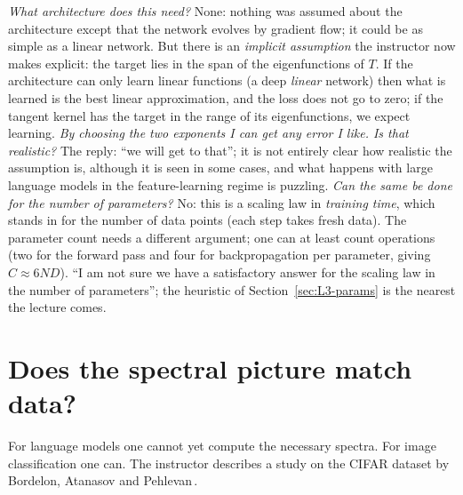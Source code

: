 \begin{discussion}
\emph{What architecture does this need?} None: nothing was assumed about the architecture except that the network evolves by gradient flow; it could be as simple as a linear network. But there is an \emph{implicit assumption} the instructor now makes explicit: the target lies in the span of the eigenfunctions of $T$. If the architecture can only learn linear functions (a deep \emph{linear} network) then what is learned is the best linear approximation, and the loss does not go to zero; if the tangent kernel has the target in the range of its eigenfunctions, we expect learning.
\emph{By choosing the two exponents I can get any error I like. Is that realistic?} The reply: ``we will get to that''; it is not entirely clear how realistic the assumption is, although it is seen in some cases, and what happens with large language models in the feature-learning regime is puzzling.
\emph{Can the same be done for the number of parameters?} No: this is a scaling law in \emph{training time}, which stands in for the number of data points (each step takes fresh data). The parameter count needs a different argument; one can at least count operations (two for the forward pass and four for backpropagation per parameter, giving $C\approx6ND$). ``I am not sure we have a satisfactory answer for the scaling law in the number of parameters''; the heuristic of Section~\ref{sec:L3-params} is the nearest the lecture comes.
\end{discussion}

\section{Does the spectral picture match data?}\label{sec:L3-data}
For language models one cannot yet compute the necessary spectra. For image classification one can. The instructor describes a study on the CIFAR dataset by Bordelon, Atanasov and Pehlevan\flag\,\citep{bordelon2025}.

